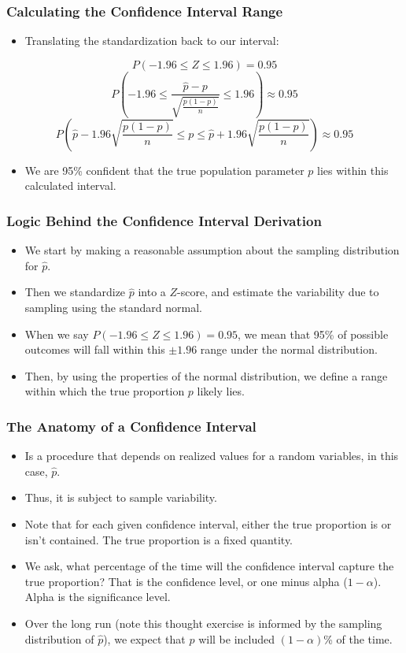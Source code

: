 \documentclass[handout]{beamer} %
\begin{document}
\begin{frame}
    \frametitle{Calculating the Confidence Interval Range}
    \begin{itemize}
        \item Translating the standardization back to our interval:
    \end{itemize}
    \[
    P(-1.96 \leq Z \leq 1.96) = 0.95
    \]
    \[
    P(-1.96 \leq  \frac{\hat{p} - p}{\sqrt{\frac{p(1-p)}{n}}} \leq 1.96) \approx 0.95
    \]
    \[
    P\left(\hat{p} - 1.96\sqrt{\frac{p(1-p)}{n}} \leq p \leq \hat{p} + 1.96\sqrt{\frac{p(1-p)}{n}}\right) \approx 0.95
    \]
    \begin{itemize}
        \item We are 95\% confident that the true population parameter \( p \) lies within this calculated interval.
    \end{itemize}
\end{frame}

\begin{frame}
    \frametitle{Logic Behind the Confidence Interval Derivation}
    \begin{itemize}
        \item We start by making a reasonable assumption about the sampling distribution for $\hat{p}$.
        \item Then we standardize $\hat{p}$ into a $Z$-score, and estimate the variability due to sampling using the standard normal.
        \item When we say \( P(-1.96 \leq Z \leq 1.96) = 0.95 \), we mean that 95\% of possible outcomes will fall within this $\pm1.96$ range under the normal distribution.
        \item Then, by using the properties of the normal distribution, we define a range within which the true proportion \( p \) likely lies.
    \end{itemize}
\end{frame}

\begin{frame}
    \frametitle{The Anatomy of a Confidence Interval}
    \begin{itemize}
        \item Is a procedure that depends on realized values for a random variables, in this case, $\hat{p}$.
        \item Thus, it is subject to sample variability.
        \item Note that for each given confidence interval, either the true proportion is or isn't contained. The true proportion is a fixed quantity.
        \item We ask, what percentage of the time will the confidence interval capture the true proportion? That is the confidence level, or one minus alpha ($1-\alpha$). Alpha is the significance level.
        \item Over the long run (note this thought exercise is informed by the sampling distribution of $\hat{p}$), we expect that $p$ will be included $(1-\alpha)$\% of the time.
    \end{itemize}
\end{frame}
\end{document}
